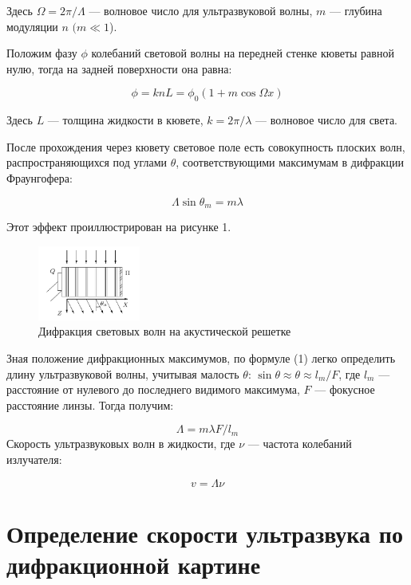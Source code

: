 \documentclass[journal, a4paper]{IEEEtran}
\begin{document}
	Здесь $ \Omega = 2 \pi / \Lambda $ --- волновое число для ультразвуковой волны, $ m $ --- глубина модуляции $ n $ $ (m \ll 1 $).
	
	Положим фазу $ \phi $ колебаний световой волны на передней стенке кюветы равной нулю, тогда на задней поверхности она равна:
	
	\begin{equation}\label{}
	\phi  = k n L = \phi_0 (1 + m \cos \Omega x)
	\end{equation}
	
	Здесь $ L $ --- толщина жидкости в кювете, $ k = 2 \pi / \lambda $ --- волновое число для света.
	
	После прохождения через кювету световое поле есть совокупность плоских волн, распространяющихся под углами $ \theta $, соответствующими максимумам в дифракции Фраунгофера:
	
\begin{equation}\label{}	
	\Lambda \sin \theta_m = m \lambda
\end{equation}

	Этот эффект проиллюстрирован на рисунке 1.
	\begin{figure}[h!]
		\centering	
		\includegraphics[width=0.3\textwidth]{difraction.png}
		\caption{Дифракция световых волн на акустической решетке}
		\label{diff}
	\end{figure}

	Зная положение дифракционных максимумов, по формуле (1) легко определить длину ультразвуковой волны, учитывая малость $ \theta $: $ \sin \theta \approx \theta \approx l_m /F  $, где $ l_m $ --- расстояние от нулевого до последнего видимого максимума, $ F $ --- фокусное расстояние линзы. Тогда получим:
	
	\begin{equation}\label{}
	 \Lambda = m \lambda F/ l_m 
	\end{equation}
	Скорость ультразвуковых волн в жидкости, где $ \nu $ --- частота колебаний излучателя:
	
\begin{equation}\label{}
	v = \Lambda \nu 
\end{equation}

\section{Определение скорости ультразвука по дифракционной картине}
	
\end{document}
